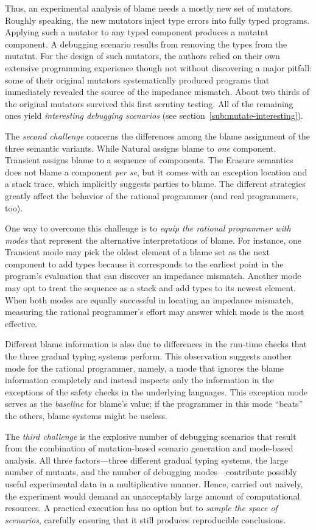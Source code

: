 Thus, an experimental analysis of blame needs a mostly new set of mutators.
Roughly speaking, the new mutators inject type errors into fully typed programs.
Applying such a mutator to any typed component produces a mutatnt component.  A
debugging scenario results from removing the types from the mutatnt. For the
design of such mutators, the authors relied on their own extensive programming
experience though not without discovering a major pitfall: some of their
original mutators systematically produced programs that immediately revealed the
source of the impedance mismatch. About two thirds of the original mutators
survived this first scrutiny testing. All of the remaining ones yield {\em
interesting debugging scenarios\/} (see section~\ref{sub:mutate-interesting}).

The {\em second challenge\/} concerns the differences among the blame assignment
of the three semantic variants.  While Natural assigns blame to {\em one\/}
component, Transient assigns blame to a sequence of components. The Erasure
semantics does not blame a component {\it per se\/}, but it comes with an
exception location and a stack trace, which implicitly suggests parties to
blame.  The different strategies greatly affect the behavior of the rational
programmer (and real programmers, too).

One way to overcome this challenge is to {\em equip the rational programmer with
modes \/} that represent the alternative interpretations of blame.  For
instance, one Transient mode may pick the oldest element of a blame set as
the next component to add types because it corresponds to the earliest point in
the program's evaluation that can discover an impedance mismatch.  Another mode
may opt to treat the sequence as a stack and add types to its newest element.
When both modes are equally successful in locating an impedance mismatch,
measuring the rational programmer's effort may answer which mode is the most
effective.

Different blame information is also due to differences in the run-time checks
that the three gradual typing systems perform. This observation suggests another
mode for the rational programmer, namely, a mode that ignores the blame
information completely and instead inspects only the information in the
exceptions of the safety checks in the underlying languages.  This exception
mode serves as the {\em baseline\/} for blame's value; if the programmer in this
mode ``beats'' the others, blame systems might be useless.

The {\em third challenge\/} is the explosive number of debugging scenarios that
result from the combination of mutation-based scenario generation and mode-based
analysis. All three factors---three different gradual typing systems, the large
number of mutants, and the number of debugging modes---contribute possibly
useful experimental data in a multiplicative manner. Hence, carried out naively,
the experiment would demand an unacceptably large amount of computational
resources.  A practical execution has no option but to {\em sample the space of
scenarios\/}, carefully ensuring that it still produces reproducible
conclusions.


